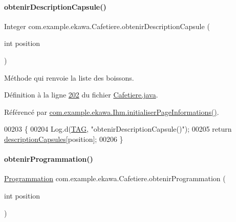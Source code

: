 \paragraph{\texorpdfstring{obtenir\+Description\+Capsule()}{obtenirDescriptionCapsule()}}
{\footnotesize\ttfamily Integer com.\+example.\+ekawa.\+Cafetiere.\+obtenir\+Description\+Capsule (\begin{DoxyParamCaption}\item[{int}]{position }\end{DoxyParamCaption})}



Méthode qui renvoie la liste des boissons. 



Définition à la ligne \hyperlink{_cafetiere_8java_source_l00202}{202} du fichier \hyperlink{_cafetiere_8java_source}{Cafetiere.\+java}.



Référencé par \hyperlink{_ihm_8java_source_l00637}{com.\+example.\+ekawa.\+Ihm.\+initialiser\+Page\+Informations()}.


\begin{DoxyCode}
00203     \{
00204         Log.d(\hyperlink{classcom_1_1example_1_1ekawa_1_1_cafetiere_aa0c1fd99a2508b06c462aea17034aa91}{TAG}, \textcolor{stringliteral}{"obtenirDescriptionCapsule()"});
00205         \textcolor{keywordflow}{return} \hyperlink{classcom_1_1example_1_1ekawa_1_1_cafetiere_a054b6a7668e317cfa1da3d8600311e4e}{descriptionCapsules}[position];
00206     \}
\end{DoxyCode}
\mbox{\label{classcom_1_1example_1_1ekawa_1_1_cafetiere_aaaaa95b5ed36da9d14f5aa60116a66b8}} 
\paragraph{\texorpdfstring{obtenir\+Programmation()}{obtenirProgrammation()}}
{\footnotesize\ttfamily \hyperlink{classcom_1_1example_1_1ekawa_1_1_programmation}{Programmation} com.\+example.\+ekawa.\+Cafetiere.\+obtenir\+Programmation (\begin{DoxyParamCaption}\item[{int}]{position }\end{DoxyParamCaption})}



